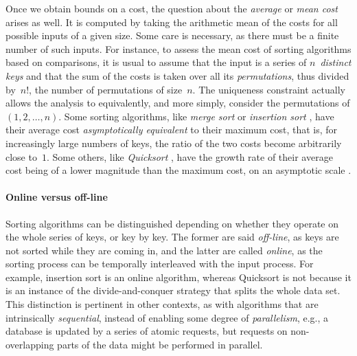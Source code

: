 Once we obtain bounds on a cost, the question about the \emph{average}
or \emph{mean cost} \citep{VitterFlajolet_1990}
\citep[\S{}1.2.10]{Knuth_1997} arises as well. It is computed by
taking the arithmetic mean of the costs for all possible inputs of a
given size. Some care is necessary, as there must be a finite number
of such inputs. For instance, to assess the mean cost of sorting
algorithms based on comparisons, it is usual to assume that the input
is a series of \(n\)~\emph{distinct
keys} and that the sum of the costs is
taken over all its \emph{permutations}, thus
divided by~\(n!\), the number of permutations of size~\(n\). The
uniqueness constraint actually allows the analysis to equivalently,
and more simply, consider the permutations of \((1,2,\dots,n)\). Some
sorting algorithms, like \emph{merge sort}
\cite[\S{}5.2.4]{Knuth_1998} \cite[\S{}2.3]{CLRS_2009} or
\emph{insertion sort} \cite[\S{}5.2.1]{Knuth_1998}
\cite[\S{}2.1]{CLRS_2009}, have their average cost
\emph{asymptotically equivalent} to their maximum cost, that is, for
increasingly large numbers of keys, the ratio of the two costs become
arbitrarily close to~\(1\). Some others,
like \emph{Quicksort} \cite[\S{}5.2.2]{Knuth_1998}
\cite[\S{}7]{CLRS_2009}, have the growth rate of their average cost
being of a lower magnitude than the maximum cost, on an asymptotic
scale \cite[\S{}9]{GrahamKnuthPatashnik_1994}.

\paragraph{Online versus off-line}
\label{par:online_vs_offline}

Sorting algorithms can be distinguished depending on whether they
operate on the whole series of keys, or key by key. The former are
said \emph{off\hyp{}line}, as keys are not
sorted while they are coming in, and the latter are called
\emph{online}, as the sorting process can be
temporally interleaved with the input process. For example, insertion
sort is an online algorithm, whereas Quicksort is not because it is
an instance of the divide\hyp{}and\hyp{}conquer strategy that splits
the whole data set. This distinction is pertinent in other contexts,
as with algorithms that are intrinsically \emph{sequential}, instead
of enabling some degree of \emph{parallelism}, e.g., a database is
updated by a series of atomic requests, but requests on
non\hyp{}overlapping parts of the data might be performed in parallel.

